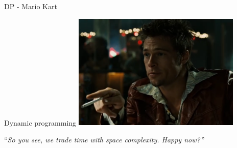 \documentclass{beamer}
\begin{document}
%

\begin{frame}{DP - Mario Kart}
	
\end{frame}

%

\begin{frame}{Dynamic programming}
	\centering
	\includegraphics[width=0.6\textwidth]{tyler2.png}

	\bigskip
	``\emph{So you see, we trade time with space complexity. Happy now?}\,''
\end{frame}
\end{document}
